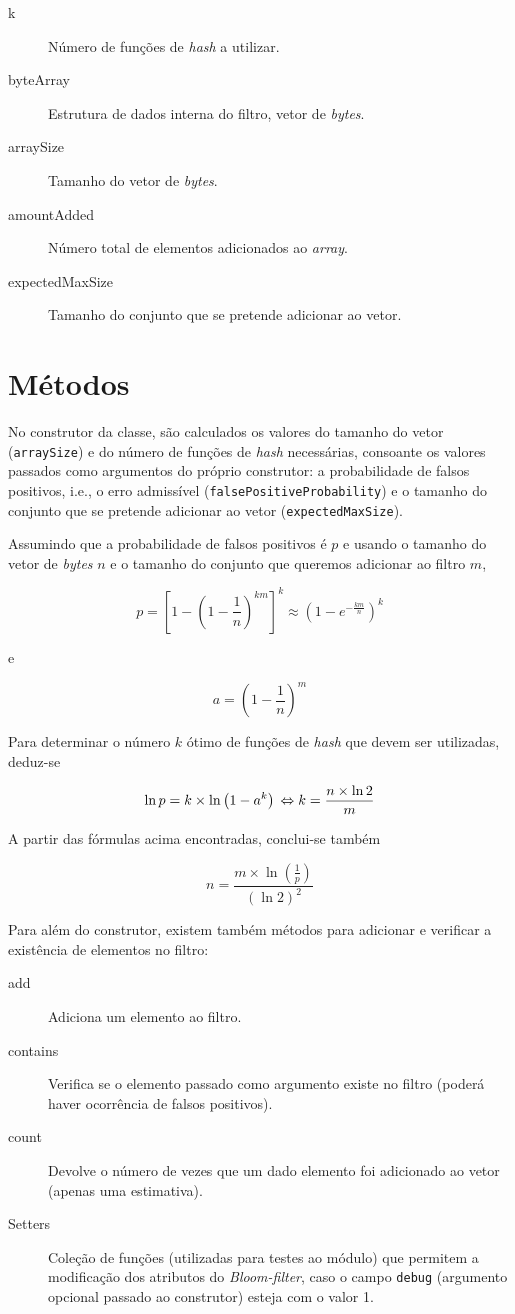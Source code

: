\documentclass[a4paper,11pt,openright,oneside]{report}
\begin{document}
\begin{description}
\item[k]
Número de funções de \textit{hash} a utilizar.
\item[byteArray]
Estrutura de dados interna do filtro, vetor de \textit{bytes}.
\item[arraySize]
Tamanho do vetor de \textit{bytes}.
\item[amountAdded]
Número total de elementos adicionados ao \textit{array}.
\item[expectedMaxSize]
Tamanho do conjunto que se pretende adicionar ao vetor.
\end{description}

\section{Métodos}
\label{sec.methods}

No construtor da classe, são calculados os valores do tamanho do vetor (\texttt{arraySize}) e do número de funções de \textit{hash} necessárias, consoante os valores passados como argumentos do próprio construtor: a probabilidade de falsos positivos, i.e., o erro admissível (\texttt{falsePositiveProbability}) e o tamanho do conjunto que se pretende adicionar ao vetor (\texttt{expectedMaxSize}). 

Assumindo que a probabilidade de falsos positivos é $p$ e usando o tamanho do vetor de \textit{bytes} $n$ e o tamanho do conjunto que queremos adicionar ao filtro $m$,

$$ p =  \left[1 - \left(1 - \frac{1}{n}\right)^{km}\right]^k \approx  \left(1 - e^{-\frac{km}{n}}\right)^k $$

e

$$ a = \left(1 - \frac{1}{n}\right)^m $$

Para determinar o número $k$ ótimo de funções de \textit{hash} que devem ser utilizadas, deduz-se

$$ \ln p = k \times \ln \left(1 - a^k\right) \\
\Leftrightarrow k =  \frac{n \times \ln 2}{m}$$

A partir das fórmulas acima encontradas, conclui-se também

$$ n = \frac{m \times \ln \left(\frac{1}{p}\right)}{\left(\ln 2\right) ^ 2} $$

Para além do construtor, existem também métodos para adicionar e verificar a existência de elementos no filtro:

\begin{description}
\item[add]
Adiciona um elemento ao filtro.
\item[contains]
Verifica se o elemento passado como argumento existe no filtro (poderá haver ocorrência de falsos positivos).
\item[count]
Devolve o número de vezes que um dado elemento foi adicionado ao vetor (apenas uma estimativa).
\item[Setters]
Coleção de funções (utilizadas para testes ao módulo) que permitem a modificação dos atributos do \textit{Bloom-filter}, caso o campo \texttt{debug} (argumento opcional passado ao construtor) esteja com o valor 1.
\end{description}
\end{document}
